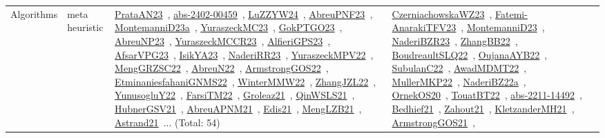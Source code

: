 {\begin{longtable}{lp{3cm}>{\raggedright\arraybackslash}p{6cm}>{\raggedright\arraybackslash}p{6cm}>{\raggedright\arraybackslash}p{8cm}}
\index{meta heuristic}\index{Algorithms!meta heuristic}Algorithms & meta heuristic & \href{../works/PrataAN23.pdf}{PrataAN23}~\cite{PrataAN23}, \href{../works/abs-2402-00459.pdf}{abs-2402-00459}~\cite{abs-2402-00459}, \href{../works/LuZZYW24.pdf}{LuZZYW24}~\cite{LuZZYW24}, \href{../works/AbreuPNF23.pdf}{AbreuPNF23}~\cite{AbreuPNF23}, \href{../works/MontemanniD23a.pdf}{MontemanniD23a}~\cite{MontemanniD23a}, \href{../works/YuraszeckMC23.pdf}{YuraszeckMC23}~\cite{YuraszeckMC23}, \href{../works/GokPTGO23.pdf}{GokPTGO23}~\cite{GokPTGO23}, \href{../works/AbreuNP23.pdf}{AbreuNP23}~\cite{AbreuNP23}, \href{../works/YuraszeckMCCR23.pdf}{YuraszeckMCCR23}~\cite{YuraszeckMCCR23}, \href{../works/AlfieriGPS23.pdf}{AlfieriGPS23}~\cite{AlfieriGPS23}, \href{../works/AfsarVPG23.pdf}{AfsarVPG23}~\cite{AfsarVPG23}, \href{../works/IsikYA23.pdf}{IsikYA23}~\cite{IsikYA23}, \href{../works/NaderiRR23.pdf}{NaderiRR23}~\cite{NaderiRR23}, \href{../works/YuraszeckMPV22.pdf}{YuraszeckMPV22}~\cite{YuraszeckMPV22}, \href{../works/MengGRZSC22.pdf}{MengGRZSC22}~\cite{MengGRZSC22}, \href{../works/AbreuN22.pdf}{AbreuN22}~\cite{AbreuN22}, \href{../works/ArmstrongGOS22.pdf}{ArmstrongGOS22}~\cite{ArmstrongGOS22}, \href{../works/EtminaniesfahaniGNMS22.pdf}{EtminaniesfahaniGNMS22}~\cite{EtminaniesfahaniGNMS22}, \href{../works/WinterMMW22.pdf}{WinterMMW22}~\cite{WinterMMW22}, \href{../works/ZhangJZL22.pdf}{ZhangJZL22}~\cite{ZhangJZL22}, \href{../works/YunusogluY22.pdf}{YunusogluY22}~\cite{YunusogluY22}, \href{../works/FarsiTM22.pdf}{FarsiTM22}~\cite{FarsiTM22}, \href{../works/Groleaz21.pdf}{Groleaz21}~\cite{Groleaz21}, \href{../works/QinWSLS21.pdf}{QinWSLS21}~\cite{QinWSLS21}, \href{../works/HubnerGSV21.pdf}{HubnerGSV21}~\cite{HubnerGSV21}, \href{../works/AbreuAPNM21.pdf}{AbreuAPNM21}~\cite{AbreuAPNM21}, \href{../works/Edis21.pdf}{Edis21}~\cite{Edis21}, \href{../works/MengLZB21.pdf}{MengLZB21}~\cite{MengLZB21}, \href{../works/Astrand21.pdf}{Astrand21}~\cite{Astrand21}... (Total: 54) & \href{../works/CzerniachowskaWZ23.pdf}{CzerniachowskaWZ23}~\cite{CzerniachowskaWZ23}, \href{../works/Fatemi-AnarakiTFV23.pdf}{Fatemi-AnarakiTFV23}~\cite{Fatemi-AnarakiTFV23}, \href{../works/MontemanniD23.pdf}{MontemanniD23}~\cite{MontemanniD23}, \href{../works/NaderiBZR23.pdf}{NaderiBZR23}~\cite{NaderiBZR23}, \href{../works/ZhangBB22.pdf}{ZhangBB22}~\cite{ZhangBB22}, \href{../works/BoudreaultSLQ22.pdf}{BoudreaultSLQ22}~\cite{BoudreaultSLQ22}, \href{../works/OujanaAYB22.pdf}{OujanaAYB22}~\cite{OujanaAYB22}, \href{../works/SubulanC22.pdf}{SubulanC22}~\cite{SubulanC22}, \href{../works/AwadMDMT22.pdf}{AwadMDMT22}~\cite{AwadMDMT22}, \href{../works/MullerMKP22.pdf}{MullerMKP22}~\cite{MullerMKP22}, \href{../works/NaderiBZ22a.pdf}{NaderiBZ22a}~\cite{NaderiBZ22a}, \href{../works/OrnekOS20.pdf}{OrnekOS20}~\cite{OrnekOS20}, \href{../works/TouatBT22.pdf}{TouatBT22}~\cite{TouatBT22}, \href{../works/abs-2211-14492.pdf}{abs-2211-14492}~\cite{abs-2211-14492}, \href{../works/Bedhief21.pdf}{Bedhief21}~\cite{Bedhief21}, \href{../works/Zahout21.pdf}{Zahout21}~\cite{Zahout21}, \href{../works/KletzanderMH21.pdf}{KletzanderMH21}~\cite{KletzanderMH21}, \href{../works/ArmstrongGOS21.pdf}{ArmstrongGOS21}~\cite{ArmstrongGOS21}, 
\end{longtable}}
